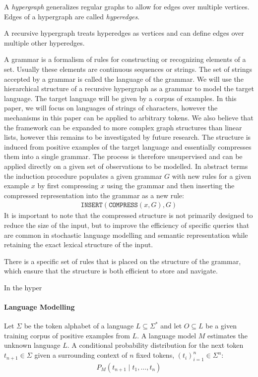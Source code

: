 A \textit{hypergraph} generalizes regular graphs to allow for edges over multiple vertices. Edges of a hypergraph are called \textit{hyperedges}.


A recursive hypergraph treats hyperedges as vertices and can define edges over multiple other hyperedges.

A grammar is a formalism of rules for constructing or recognizing elements of a set. Usually these elements are continuous sequences or strings. The set of strings accepted by a grammar is called the language of the grammar. We will use the hierarchical structure of a recursive hypergraph as a grammar to model the target language. The target language will be given by a corpus of examples. In this paper, we will focus on languages of strings of characters, however the mechanisms in this paper can be applied to arbitrary tokens. We also believe that the framework can be expanded to more complex graph structures than linear lists, however this remains to be investigated by future research.
The structure is induced from positive examples of the target language and essentially compresses them into a single grammar. The process is therefore unsupervised and can be applied directly on a given set of observations to be modelled.
In abstract terms the induction procedure populates a given grammar $G$ with new rules for a given example $x$ by first compressing $x$ using the grammar and then inserting the compressed representation into the grammar as a new rule:
\begin{align*}
    \texttt{INSERT}(\texttt{COMPRESS}(x, G), G)
\end{align*}
It is important to note that the compressed structure is not primarily designed to reduce the size of the input, but to improve the efficiency of specific queries that are common in stochastic language modelling and semantic representation while retaining the exact lexical structure of the input.

There is a specific set of rules that is placed on the structure of the grammar, which ensure that the structure is both efficient to store and navigate.

In the hyper

\paragraph*{Language Modelling}
Let $\Sigma$ be the token alphabet of a language $L \subseteq \Sigma^*$ and let $O \subseteq L$ be a given training corpus of positive examples from $L$.
A language model $M$ estimates the unknown language $L$.
A conditional probability distribution for the next token $t_{n+1} \in \Sigma$ given a surrounding context of $n$ fixed tokens, $(t_i)_{i = 1}^n \in \Sigma^n$:
\begin{align*}
    P_M(t_{n+1} \mid t_1, \ldots, t_n)
\end{align*}

